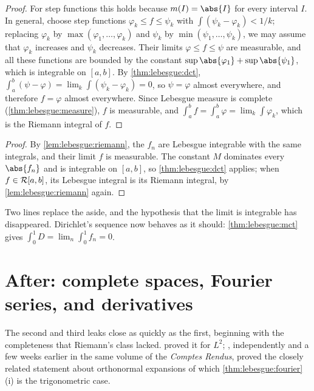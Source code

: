 \begin{refsection}
\begin{proof}
For step functions this holds because $m(I)=\abs{I}$ for every interval $I$. In general, choose step functions $\varphi_k\le f\le\psi_k$ with $\int(\psi_k-\varphi_k)<1/k$; replacing $\varphi_k$ by $\max(\varphi_1,\dots,\varphi_k)$ and $\psi_k$ by $\min(\psi_1,\dots,\psi_k)$, we may assume that $\varphi_k$ increases and $\psi_k$ decreases. Their limits $\varphi\le f\le\psi$ are measurable, and all these functions are bounded by the constant $\sup\abs{\varphi_1}+\sup\abs{\psi_1}$, which is integrable on $[a,b]$. By \cref{thm:lebesgue:dct}, $\int_a^b(\psi-\varphi)=\lim_k\int(\psi_k-\varphi_k)=0$, so $\psi=\varphi$ almost everywhere, and therefore $f=\varphi$ almost everywhere. Since Lebesgue measure is complete (\cref{thm:lebesgue:measure}), $f$ is measurable, and $\int_a^bf=\int_a^b\varphi=\lim_k\int\varphi_k$, which is the Riemann integral of $f$.
\end{proof}


\begin{proof}
By \cref{lem:lebesgue:riemann}, the $f_n$ are Lebesgue integrable with the same integrals, and their limit $f$ is measurable. The constant $M$ dominates every $\abs{f_n}$ and is integrable on $[a,b]$, so \cref{thm:lebesgue:dct} applies; when $f\in\mathcal{R}[a,b]$, its Lebesgue integral is its Riemann integral, by \cref{lem:lebesgue:riemann} again.
\end{proof}

Two lines replace the aside, and the hypothesis that the limit is integrable has disappeared. Dirichlet's sequence now behaves as it should: \cref{thm:lebesgue:mct} gives $\int_0^1D=\lim_n\int_0^1f_n=0$.

\section{After: complete spaces, Fourier series, and derivatives}\label{sec:lebesgue:complete}

The second and third leaks close as quickly as the first, beginning with the completeness that Riemann's class lacked. \textcite{Fischer1907} proved it for $L^2$; \textcite{Riesz1907}, independently and a few weeks earlier in the same volume of the \emph{Comptes Rendus}, proved the closely related statement about orthonormal expansions of which \cref{thm:lebesgue:fourier}(i) is the trigonometric case.


\end{refsection}

